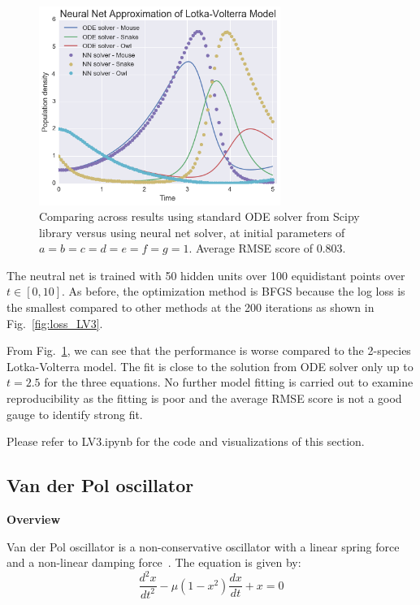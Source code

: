 \documentclass[11pt]{article}
\begin{document}
\begin{figure}
\centering
\includegraphics[width=0.7\textwidth]{LV_Compare_3_species.png}
      \caption{Comparing across results using standard ODE solver from Scipy library versus using neural net solver, at initial parameters of $a = b = c = d = e = f = g = 1 $. Average RMSE score of 0.803. \label{fig:LVFig_3_species}}
\end{figure}

The neutral net is trained with 50 hidden units over 100 equidistant points over $t \in [0, 10]$. As before, the optimization method is BFGS because the log loss is the smallest compared to other methods at the 200 iterations as shown in Fig.~\ref{fig:loss_LV3}. 

From Fig.~\ref{fig:LVFig_3_species}, we can see that the performance is worse compared to the 2-species Lotka-Volterra model. The fit is close to the solution from ODE solver only up to $t = 2.5$ for the three equations. No further model fitting is carried out to examine reproducibility as the fitting is poor and the average RMSE score is not a good gauge to identify strong fit. 

Please refer to LV3.ipynb for the code and visualizations of this section.

\subsection{Van der Pol oscillator}
\textbf{Overview}

Van der Pol oscillator is a non-conservative oscillator with a linear spring force and a non-linear damping force~\cite{REF4}. The equation is given by:
     \begin{equation}
      \frac{d^2x}{dt^2} - \mu(1-x^2)\frac{dx}{dt} + x = 0
      \label{eq:VDP}
    \end{equation}
    
\end{document}
